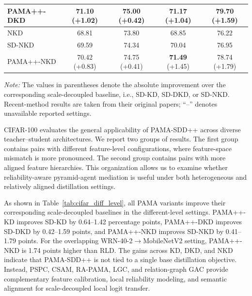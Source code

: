\documentclass[a4paper,fleqn]{cas-dc}
\begin{document}
\begin{table}[pos=t]
{\begin{tabular}{lcccc}
PAMA++-DKD & \textbf{71.10} {\scriptsize (+1.02)} 
         & 75.00 {\scriptsize (+0.42)} 
         & 71.17 {\scriptsize (+1.04)} 
         & \textbf{79.70} {\scriptsize (+1.59)} \\
\midrule
NKD~\cite{yang2023knowledge}      & 68.81 & 73.80 & 68.85 & 76.22 \\
SD-NKD~\cite{wei2024scaled}   & 69.59 & 74.34 & 70.04 & 76.95 \\
PAMA++-NKD & 70.42 {\scriptsize (+0.83)} 
         & 74.75 {\scriptsize (+0.41)} 
         & \textbf{71.49} {\scriptsize (+1.45)} 
         & 78.74 {\scriptsize (+1.79)} \\
\bottomrule
\end{tabular}
}
\vspace{2pt}
\begin{minipage}{0.98\textwidth}
\footnotesize
\textit{Note:} The values in parentheses denote the absolute improvement over the corresponding scale-decoupled baseline, i.e., SD-KD, SD-DKD, or SD-NKD. Recent-method results are taken from their original papers; ``--'' denotes unavailable reported settings.
\end{minipage}
\end{table}

CIFAR-100 evaluates the general applicability of PAMA-SDD++ across diverse
teacher--student architectures. We report two groups of results. The first
group contains pairs with different feature-level configurations, where
feature-space mismatch is more pronounced. The second group contains pairs
with more aligned feature hierarchies. This organization allows us to
examine whether reliability-aware pyramid-agent mediation is useful under
both heterogeneous and relatively aligned distillation settings.



As shown in Table~\ref{tab:cifar_diff_level}, all PAMA variants improve
their corresponding scale-decoupled baselines in the different-level
settings. PAMA++-KD improves SD-KD by 0.64--1.42 percentage points,
PAMA++-DKD improves SD-DKD by 0.42--1.59 points, and PAMA++-NKD improves
SD-NKD by 0.41--1.79 points. For the overlapping
WRN-40-2$\rightarrow$MobileNetV2 setting, PAMA++-NKD is 1.74 points higher
than RLD. The gains across KD, DKD, and NKD indicate
that PAMA-SDD++ is not tied to a single base distillation objective. Instead,
PSPC, CSAM, RA-PAMA, LGC, and relation-graph GAC provide complementary
feature calibration, local reliability modeling, and semantic alignment for
scale-decoupled local logit transfer.
\end{document}
